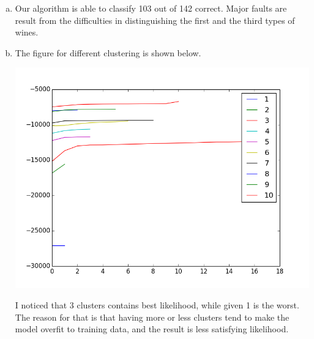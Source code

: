 \documentclass[notitlepage]{article}
\begin{document}
\begin{enumerate}[(a).]
\item Our algorithm is able to classify 103 out of 142 correct. Major faults are result from the difficulties in distinguishing the first and the third types of wines.

\item The figure for different clustering is shown below. 

\includegraphics[width=0.7\columnwidth]{different_cluster.png}

I noticed that 3 clusters contains best likelihood, while given 1 is the worst. The reason for that is that having more or less clusters tend to make the model overfit to training data, and the result is less satisfying likelihood.

\end{enumerate}
\end{document}
